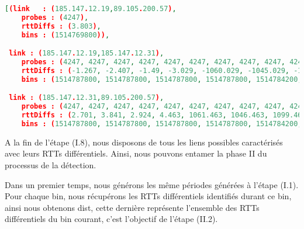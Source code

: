 \begin{lstlisting}[language=json,firstnumber=1, caption={Illustration de l'ordre des liens}, basicstyle = \footnotesize]
[(link   : (185.147.12.19,89.105.200.57), 
    probes : (4247), 
    rttDiffs : (3.803), 
    bins : (1514769800)),  

 link : (185.147.12.19,185.147.12.31), 
    probes : (4247, 4247, 4247, 4247, 4247, 4247, 4247, 4247, 4247, 4247, 4247, 4247, 4247, 4247, 4247, 4247, 4247, 4247, 4247, 4247, 4247, 4247, 4247, 4247), 
    rttDiffs : (-1.267, -2.407, -1.49, -3.029, -1060.029, -1045.029, -1098.029, -1080.029, -680.029, -845.029, -998.029, -800.029, -1.029, -2.029, -1.557, -3.197, -1.277, -2.017, -1.257, -2.968, -0.96, -1.967, -0.987, -3.201), 
    bins : (1514787800, 1514787800, 1514787800, 1514787800, 1514784200, 1514784200, 1514784200, 1514784200, 1514780600, 1514780600, 1514780600, 1514780600, 1514769800, 1514769800, 1514769800, 1514769800, 1514773400, 1514773400, 1514773400, 1514773400, 1514777000, 1514777000, 1514777000, 1514777000)),  

 link : (185.147.12.31,89.105.200.57),
    probes : (4247, 4247, 4247, 4247, 4247, 4247, 4247, 4247, 4247, 4247, 4247, 4247, 4247, 4247, 4247, 4247, 4247, 4247, 4247, 4247, 4247, 4247, 4247, 4247, 4247),
    rttDiffs : (2.701, 3.841, 2.924, 4.463, 1061.463, 1046.463, 1099.463, 1081.463, 681.463, 846.463, 999.463, 801.463, 2.463, 3.463, 2.991, 4.631, -7.75, 2.711, 3.451, 2.691, 4.402, 2.394, 3.401, 2.421, 4.635),
    bins : (1514787800, 1514787800, 1514787800, 1514787800, 1514784200, 1514784200, 1514784200, 1514784200, 1514780600, 1514780600, 1514780600, 1514780600, 1514769800, 1514769800, 1514769800, 1514769800, 1514769800, 1514773400, 1514773400, 1514773400, 1514773400, 1514777000, 1514777000, 1514777000, 1514777000))]
\end{lstlisting}


A la fin de l'étape (I.8), nous disposons de tous les liens possibles caractérisés avec leurs RTTs différentiels. Ainsi, nous pouvons entamer la phase II du processus de la détection.

Dans un premier temps, nous générons les même  périodes générées à  l'étape (I.1). Pour chaque bin,  nous récupérons les RTTs différentiels identifiés durant ce bin, ainsi nous obtenons {\color{gray} dist}, cette dernière représente l'ensemble des RTTs différentiels du bin courant, c'est l'objectif de l'étape (II.2).

